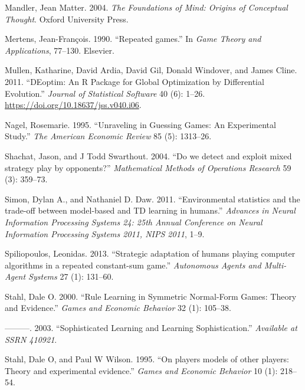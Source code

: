 \documentclass[smallextended]{svjour3}       %
\newlength{\cslhangindent}
\newenvironment{CSLReferences}[2] %
 {%
  \setlength{\parindent}{0pt}
  \ifodd #1 \everypar{\setlength{\hangindent}{\cslhangindent}}\ignorespaces\fi
  \ifnum #2 > 0
  \setlength{\parskip}{#2\baselineskip}
  \fi
 }%
 {}
\begin{document}
\begin{CSLReferences}{1}{0}
\leavevmode{}%
Mandler, Jean Matter. 2004. \emph{The Foundations of Mind: Origins of
Conceptual Thought}. Oxford University Press.

\leavevmode{}%
Mertens, Jean-François. 1990. {``{Repeated games}.''} In \emph{Game
Theory and Applications}, 77--130. Elsevier.

\leavevmode{}%
Mullen, Katharine, David Ardia, David Gil, Donald Windover, and James
Cline. 2011. {``{DEoptim}: An {R} Package for Global Optimization by
{D}ifferential {E}volution.''} \emph{Journal of Statistical Software} 40
(6): 1--26. \url{https://doi.org/10.18637/jss.v040.i06}.

\leavevmode{}%
Nagel, Rosemarie. 1995. {``Unraveling in Guessing Games: An Experimental
Study.''} \emph{The American Economic Review} 85 (5): 1313--26.

\leavevmode{}%
Shachat, Jason, and J Todd Swarthout. 2004. {``{Do we detect and exploit
mixed strategy play by opponents?}''} \emph{Mathematical Methods of
Operations Research} 59 (3): 359--73.

\leavevmode{}%
Simon, Dylan A., and Nathaniel D. Daw. 2011. {``{Environmental
statistics and the trade-off between model-based and TD learning in
humans}.''} \emph{Advances in Neural Information Processing Systems 24:
25th Annual Conference on Neural Information Processing Systems 2011,
NIPS 2011}, 1--9.

\leavevmode{}%
Spiliopoulos, Leonidas. 2013. {``{Strategic adaptation of humans playing
computer algorithms in a repeated constant-sum game}.''}
\emph{Autonomous Agents and Multi-Agent Systems} 27 (1): 131--60.

\leavevmode{}%
Stahl, Dale O. 2000. {``Rule Learning in Symmetric Normal-Form Games:
Theory and Evidence.''} \emph{Games and Economic Behavior} 32 (1):
105--38.

\leavevmode{}%
---------. 2003. {``Sophisticated Learning and Learning
Sophistication.''} \emph{Available at SSRN 410921}.

\leavevmode{}%
Stahl, Dale O, and Paul W Wilson. 1995. {``{On players models of other
players: Theory and experimental evidence}.''} \emph{Games and Economic
Behavior} 10 (1): 218--54.


\end{CSLReferences}
\end{document}

